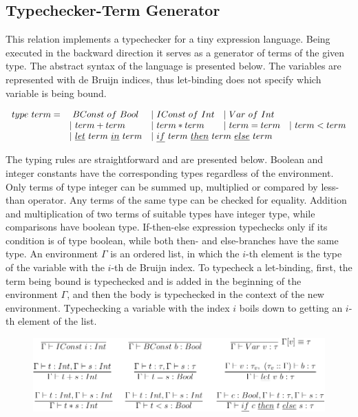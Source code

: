 \subsection{Typechecker-Term Generator}

This relation implements a typechecker for a tiny expression language.
Being executed in the backward direction it serves as a generator of terms of the given type.
The abstract syntax of the language is presented below.
The variables are represented with de Bruijn indices, thus let-binding does not specify which variable is being bound.

\[\begin{array}{lllll}
  type \ term = &\ BConst \ of \ Bool &| \ IConst \ of \ Int &| \ Var \ of \ Int & \\
  & | \ term + term &| \ term * term &| \ term = term &| \ term < term \\
  &| \ \underline{let} \ term \ \underline{in} \ term
  &\multicolumn{2}{l}{| \ \underline{if} \ term \ \underline{then} \ term \ \underline{else} \ term} &
\end{array}\]

The typing rules are straightforward and are presented below.
Boolean and integer constants have the corresponding types regardless of the environment.
Only terms of type integer can be summed up, multiplied or compared by less-than operator.
Any terms of the same type can be checked for equality.
Addition and multiplication of two terms of suitable types have integer type, while comparisons have boolean type.
If-then-else expression typechecks only if its condition is of type boolean, while both then- and else-branches have the same type.
An environment $\Gamma$ is an ordered list, in which the $i$-th element is the type of the variable with the $i$-th de Bruijn index.
To typecheck a let-binding, first, the term being bound is typechecked and is added in the beginning of the environment $\Gamma$, and then the body is typechecked in the context of the new environment.
Typechecking a variable with the index $i$ boils down to getting an $i$-th element of the list.

\begin{figure}[!h]
  \centering
  \includegraphics[width=\textwidth]{figures/typechecker-crop.pdf}
\end{figure}


